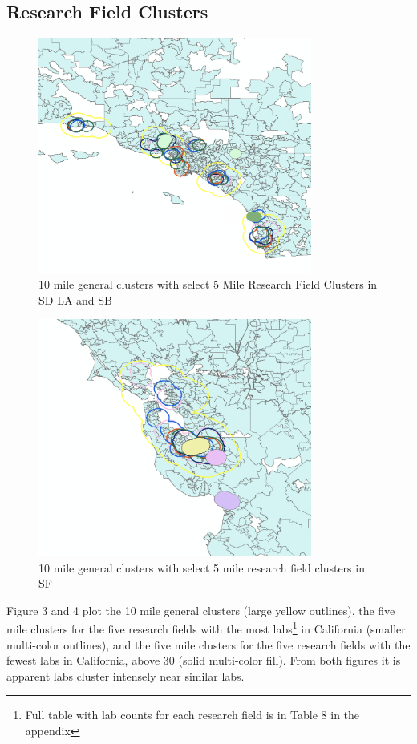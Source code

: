 \documentclass[12pt,letterpaper]{article}
\begin{document}
\subsection{Research Field Clusters}
\begin{figure}[H]
    \centering
    \includegraphics[width=9cm]{RLA.png}
    \caption{10 mile general clusters with select 5 Mile Research Field Clusters in SD LA and SB}
    \label{fig:lab3}
\end{figure}
\begin{figure}[H]
    \centering
    \includegraphics[width=9cm]{RSF.png}
    \caption{10 mile general clusters with select 5 mile research field clusters in SF}
    \label{fig:lab4}
\end{figure}
\par 
Figure 3 and 4 plot the 10 mile general clusters (large yellow outlines), the five mile clusters for the five research fields with the most labs\footnote{Full table with lab counts for each research field is in Table 8 in the appendix} in California (smaller multi-color outlines), and the five mile clusters for the five research fields with the fewest labs in California, above 30 (solid multi-color fill). From both figures it is apparent labs cluster intensely near similar labs. 
\end{document}

